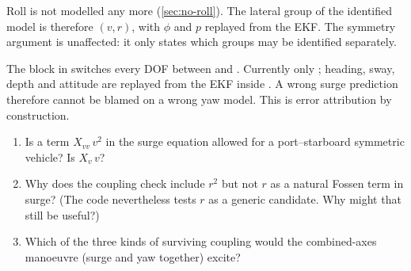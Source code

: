 \begin{revised}[title=Revised 15 October 2026]
Roll is not modelled any more (\cref{sec:no-roll}). The lateral group of the identified model is
therefore $(v, r)$, with $\phi$ and $p$ replayed from the EKF. The symmetry argument is
unaffected: it only states which groups may be identified separately.
\end{revised}

\begin{incode}
The  block in  switches every DOF between  and
. Currently only ; heading, sway, depth and attitude are
replayed from the EKF inside . A wrong surge prediction therefore cannot
be blamed on a wrong yaw model. This is error attribution by construction.
\end{incode}

\begin{questions}
\begin{enumerate}
  \item Is a term $X_{vv}\,v^2$ in the surge equation allowed for a port--starboard symmetric
        vehicle? Is $X_v\,v$?
  \item Why does the coupling check include $r^2$ but not $r$ as a natural Fossen term in
        surge? (The code nevertheless tests $r$ as a generic candidate. Why might that still
        be useful?)
  \item Which of the three kinds of surviving coupling would the combined-axes manoeuvre
        (surge and yaw together) excite?
\end{enumerate}
\end{questions}
